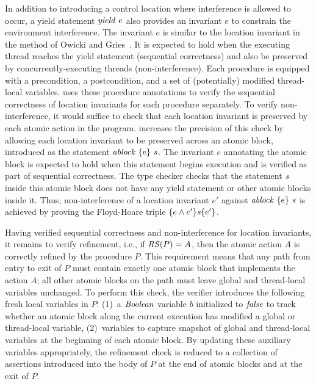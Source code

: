 In addition to introducing a control location where interference is allowed to occur, 
a yield statement $\mathit{yield}\ e$ also provides an invariant $e$ 
to constrain the environment interference.
The invariant $e$ is similar to the location invariant in the method of Owicki and Gries~\cite{OwickiG76}.
It is expected to hold when the executing thread reaches the yield statement (sequential correctness) 
and also be preserved by concurrently-executing threads (non-interference).
Each procedure is equipped with a precondition, a postcondition,
and a set of (potentially) modified thread-local variables.
\civl uses these procedure annotations to verify the sequential correctness of location invariants for each
procedure separately.
To verify non-interference, it would suffice to check that each location invariant is preserved by each atomic action in the program.
\civl increases the precision of this check by allowing each location invariant to be preserved across 
an atomic block, introduced as the statement $\mathit{ablock}\ {\{e\}}\ {\mathit{s}}$.
The invariant $e$ annotating the atomic block is expected to hold when this statement begins execution and is verified as part of sequential correctness.
The \civl type checker checks that the statement $\mathit{s}$ inside this atomic block does not have any yield statement or other atomic blocks inside it.
Thus, non-interference of a location invariant $e'$ against $\mathit{ablock}\ {\{e\}}\ {\mathit{s}}$ is achieved by proving the Floyd-Hoare triple $\{e \wedge e'\}\mathit{s}\{e'\}$.

Having verified sequential correctness and non-interference for location invariants, it remains to verify refinement,
i.e., if $\mathit{RS}(P) = A$, then the atomic action $A$ is correctly refined by the procedure $P$.
This requirement means that any path from entry to exit of $P$ must contain exactly one atomic block that implements the action $A$;
all other atomic blocks on the path must leave global and thread-local variables unchanged.
To perform this check, the \civl verifier introduces the following fresh local variables in $P$:
(1)~a $\mathit{Boolean}$ variable $b$ initialized to $\mathit{false}$ to track whether an atomic block along the current execution has modified a global or thread-local variable,
(2)~variables to capture snapshot of global and thread-local variables at the beginning of each atomic block.
By updating these auxiliary variables appropriately, the refinement check is reduced to a collection of assertions introduced into the body of $P$
at the end of atomic blocks and at the exit of $P$.

